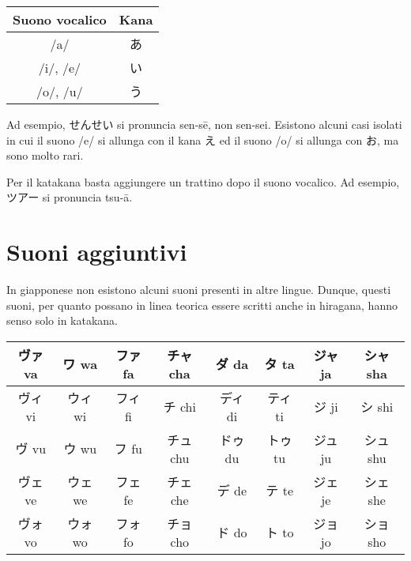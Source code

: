 \documentclass{article}
\begin{document}
        \begin{center}
            \begin{japanese}
                \begin{tabular}{|c|c|}
                    \hline
                    \textitalian{Suono vocalico} & \textitalian{Kana}\\
                    \hline\hline
                    /a/ & あ\\
                    \hline
                    /i/, /e/ & い\\
                    \hline
                    /o/, /u/ & う\\
                    \hline
                \end{tabular}
            \end{japanese}
        \end{center}

        Ad esempio, \textjapanese{せんせい} si pronuncia \textjapanese{sen-sē}, non \textjapanese{sen-sei}. Esistono
        alcuni casi isolati in cui il suono \textjapanese{/e/} si allunga con il kana \textjapanese{え} ed il suono
        \textjapanese{/o/} si allunga con \textjapanese{お}, ma sono molto rari.

        Per il katakana basta aggiungere un trattino dopo il suono vocalico. Ad esempio, \textjapanese{ツアー} si
        pronuncia \textjapanese{tsu-ā}.

    \section{Suoni aggiuntivi}

        In giapponese non esistono alcuni suoni presenti in altre lingue. Dunque, questi suoni, per quanto possano
        in linea teorica essere scritti anche in hiragana, hanno senso solo in katakana.

        \begin{center}
            \begin{japanese}
                \begin{tabular}{|c|c|c|c|c|c|c|c|}
                    \hline
                    ヴァ va & ワ wa & ファ fa & チャ cha & ダ da & タ ta & ジャ ja & シャ sha\\
                    \hline
                    ヴィ vi & ウィ wi & フィ fi & チ chi & ディ di & ティ ti & ジ ji & シ shi\\
                    \hline
                    ヴ vu & ウ wu & フ fu & チュ chu & ドゥ du & トゥ tu & ジュ ju & シュ shu\\
                    \hline
                    ヴェ ve & ウェ we & フェ fe & チェ che & デ de & テ te & ジェ je & シェ she\\
                    \hline
                    ヴォ vo & ウォ wo & フォ fo & チョ cho & ド do & ト to & ジョ jo & ショ sho\\
                    \hline
                \end{tabular}
            \end{japanese}
        \end{center}
\end{document}
